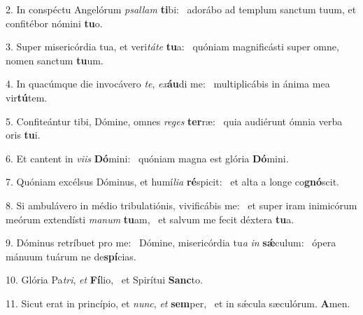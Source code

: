 2. In conspéctu Angelórum \textit{psal}\textit{lam} \textbf{ti}bi: \ast\  adorábo ad templum sanctum tuum, et confitébor nómini \textbf{tu}o.\

3. Super misericórdia tua, et veri\textit{tá}\textit{te} \textbf{tu}a: \ast\  quóniam magnificásti super omne, nomen sanctum \textbf{tu}um.\

4. In quacúmque die invocávero \textit{te}, \textit{ex}\textbf{áu}di me: \ast\  multiplicábis in ánima mea vir\textbf{tú}tem.\

5. Confiteántur tibi, Dómine, omnes \textit{re}\textit{ges} \textbf{ter}ræ: \ast\  quia audiérunt ómnia verba oris \textbf{tu}i.\

6. Et cantent in \textit{vi}\textit{is} \textbf{Dó}mini: \ast\  quóniam magna est glória \textbf{Dó}mini.\

7. Quóniam excélsus Dóminus, et humí\textit{li}\textit{a} \textbf{ré}spicit: \ast\  et alta a longe co\textbf{gnó}scit.\

8. Si ambulávero in médio tribulatiónis, vivificábis me: \dag\  et super iram inimicórum meórum extendísti \textit{ma}\textit{num} \textbf{tu}am, \ast\  et salvum me fecit déxtera \textbf{tu}a.\

9. Dóminus retríbuet pro me: \dag\  Dómine, misericórdia tu\textit{a} \textit{in} \textbf{sǽ}culum: \ast\  ópera mánuum tuárum ne de\textbf{spí}cias.\

10. Glória Pa\textit{tri}, \textit{et} \textbf{Fí}lio, \ast\  et Spirítui \textbf{Sanc}to.\

11. Sicut erat in princípio, et \textit{nunc}, \textit{et} \textbf{sem}per, \ast\  et in sǽcula sæculórum. \textbf{A}men.\

